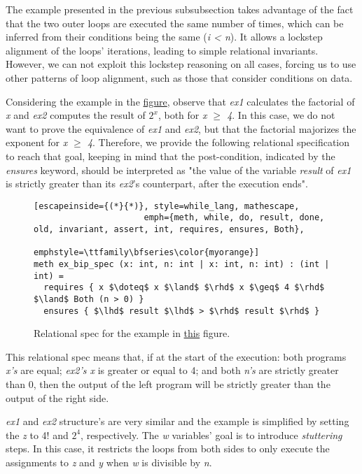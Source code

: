 The example presented in the previous subsubsection takes advantage of the fact that the two outer loops are executed the same number of times, which can be inferred from their conditions being the same (\emph{i < n}).
It allows a lockstep alignment of the loops' iterations, leading to simple relational invariants.
However, we can not exploit this lockstep reasoning on all cases, forcing us to use other patterns of loop alignment, such as those that consider conditions on data.

Considering the example in the \hyperref[fig:cond_align_loops_ex]{figure}, observe that \emph{ex1} calculates the factorial of \emph{x} and \emph{ex2} computes the result of \emph{$2^x$}, both for \emph{x $\geq$ 4}.
In this case, we do not want to prove the equivalence of \emph{ex1} and \emph{ex2}, but that the factorial majorizes the exponent for \emph{x $\geq$ 4}.
Therefore, we provide the following relational specification to reach that goal, keeping in mind that the post-condition, indicated by the \emph{ensures} keyword, should be interpreted as "the value of the variable \emph{result} of \emph{ex1} is strictly greater than its \emph{ex2}'s counterpart, after the execution ends".

\begin{figure}[h]
  \centering
  \noindent
  \begin{lstlisting}[escapeinside={(*}{*)}, style=while_lang, mathescape,
                      emph={meth, while, do, result, done, old, invariant, assert, int, requires, ensures, Both},
                      emphstyle=\ttfamily\bfseries\color{myorange}]
meth ex_bip_spec (x: int, n: int | x: int, n: int) : (int | int) =
  requires { x $\doteq$ x $\land$ $\rhd$ x $\geq$ 4 $\rhd$ $\land$ Both (n > 0) }
  ensures { $\lhd$ result $\lhd$ > $\rhd$ result $\rhd$ }
  \end{lstlisting}
  \caption{Relational spec for the example in \hyperref[fig:cond_align_loops_ex]{this} figure.}
  \label{fig:cond_align_loops_rel_spec}
\end{figure}

This relational spec means that, if at the start of the execution: both programs \emph{x's} are equal; \emph{ex2's x} is greater or equal to 4; and both \emph{n's} are strictly greater than 0, then the output of the left program will be strictly greater than the output of the right side.

\emph{ex1} and \emph{ex2} structure's are very similar and the example is simplified by setting the \emph{z} to 4! and $2^4$, respectively.
The \emph{w} variables' goal is to introduce \emph{stuttering} steps.
In this case, it restricts the loops from both sides to only execute the assignments to \emph{z} and \emph{y} when \emph{w} is divisible by \emph{n}.

